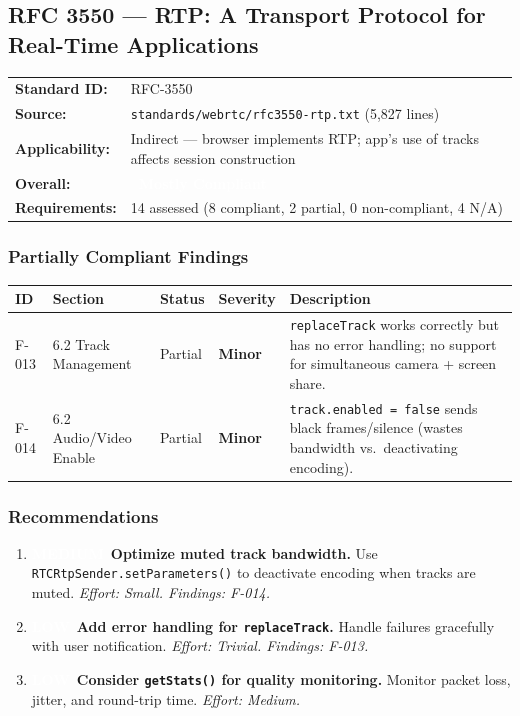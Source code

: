 \documentclass[11pt,letterpaper]{article}
\newcommand{\mostlycompliant}{\colorbox{partial}{\textcolor{white}{\textbf{\small~Mostly Compliant~}}}}
\newcommand{\sevminor}{\textcolor{minor!80!black}{\textbf{Minor}}}
\newcommand{\primedium}{\colorbox{minor!80!black}{\textcolor{white}{\small\textbf{MEDIUM}}}}
\newcommand{\prilow}{\colorbox{notapplicable}{\textcolor{white}{\small\textbf{LOW}}}}
\begin{document}
\newpage

\subsection{RFC 3550 --- RTP: A Transport Protocol for Real-Time Applications}

\begin{tabular}{ll}
\textbf{Standard ID:} & RFC-3550 \\
\textbf{Source:} & \texttt{standards/webrtc/rfc3550-rtp.txt} (5,827 lines) \\
\textbf{Applicability:} & Indirect --- browser implements RTP; app's use of tracks affects session construction \\
\textbf{Overall:} & \mostlycompliant \\
\textbf{Requirements:} & 14 assessed (8 compliant, 2 partial, 0 non-compliant, 4 N/A) \\
\end{tabular}

\subsubsection{Partially Compliant Findings}

\begin{longtable}{C{1cm}L{2.8cm}C{1.5cm}C{1.2cm}L{6.7cm}}
\toprule
\textbf{ID} & \textbf{Section} & \textbf{Status} & \textbf{Severity} & \textbf{Description} \\
\midrule
\endhead
F-013 & 6.2 Track Management & Partial & \sevminor & \texttt{replaceTrack} works correctly but has no error handling; no support for simultaneous camera + screen share. \\
\midrule
F-014 & 6.2 Audio/Video Enable & Partial & \sevminor & \texttt{track.enabled = false} sends black frames/silence (wastes bandwidth vs.\ deactivating encoding). \\
\bottomrule
\end{longtable}

\subsubsection{Recommendations}

\begin{enumerate}[leftmargin=2em]
    \item \primedium\ \textbf{Optimize muted track bandwidth.} Use \texttt{RTCRtpSender.setParameters()} to deactivate encoding when tracks are muted. \textit{Effort: Small. Findings: F-014.}
    \item \prilow\ \textbf{Add error handling for \texttt{replaceTrack}.} Handle failures gracefully with user notification. \textit{Effort: Trivial. Findings: F-013.}
    \item \prilow\ \textbf{Consider \texttt{getStats()} for quality monitoring.} Monitor packet loss, jitter, and round-trip time. \textit{Effort: Medium.}
\end{enumerate}
\end{document}
